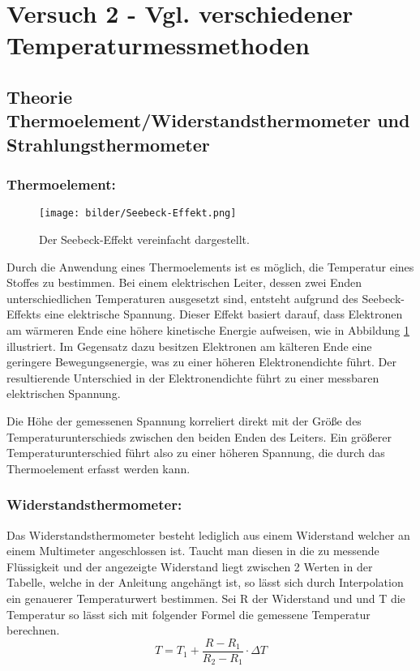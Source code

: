 \section{Versuch 2 - Vgl. verschiedener Temperaturmessmethoden}
    \subsection{Theorie Thermoelement/Widerstandsthermometer und Strahlungsthermometer}
    \subsubsection*{Thermoelement:}
    	\begin{figure}[ht]
    	\label{fig:abb2}
    	\begin{center}
    		\texttt{[image: bilder/Seebeck-Effekt.png]}
    		\caption{Der Seebeck-Effekt vereinfacht dargestellt.}
    	\end{center}
    \end{figure}
    Durch die Anwendung eines Thermoelements ist es möglich, die Temperatur eines Stoffes zu bestimmen. Bei einem elektrischen Leiter, dessen zwei Enden unterschiedlichen Temperaturen ausgesetzt sind, entsteht aufgrund des Seebeck-Effekts eine elektrische Spannung. Dieser Effekt basiert darauf, dass Elektronen am wärmeren Ende eine höhere kinetische Energie aufweisen, wie in Abbildung \ref{fig:abb2} illustriert. Im Gegensatz dazu besitzen Elektronen am kälteren Ende eine geringere Bewegungsenergie, was zu einer höheren Elektronendichte führt. Der resultierende Unterschied in der Elektronendichte führt zu einer messbaren elektrischen Spannung.
    
   Die Höhe der gemessenen Spannung korreliert direkt mit der Größe des Temperaturunterschieds zwischen den beiden Enden des Leiters. Ein größerer Temperaturunterschied führt also zu einer höheren Spannung, die durch das Thermoelement erfasst werden kann.
   \subsubsection*{Widerstandsthermometer:}
   Das Widerstandsthermometer besteht lediglich aus einem Widerstand welcher an einem Multimeter angeschlossen ist. Taucht man diesen in die zu messende Flüssigkeit und der angezeigte Widerstand liegt zwischen 2 Werten in der Tabelle, welche in der Anleitung angehängt ist, so lässt sich durch Interpolation ein genauerer Temperaturwert bestimmen. Sei R der Widerstand und und T die Temperatur so lässt sich mit folgender Formel die gemessene Temperatur berechnen.
   $$T = T_{1} + \frac{R - R_{1}}{R_{2} - R_{1}} \cdot \Delta T$$
